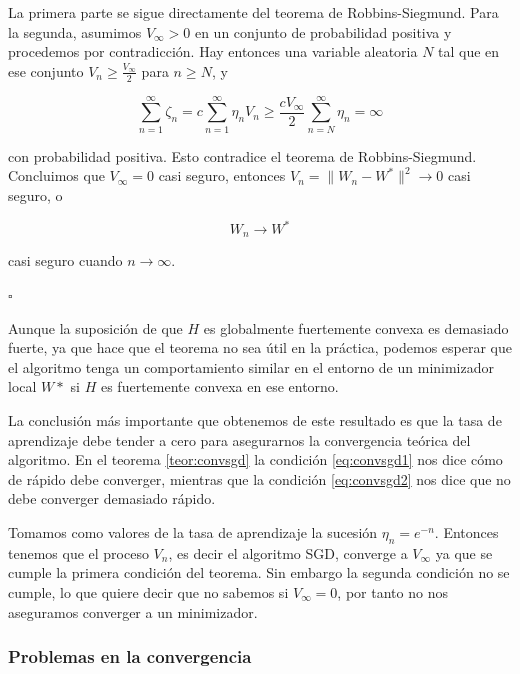 La primera parte se sigue directamente del teorema de Robbins-Siegmund. Para la segunda, asumimos $V_{\infty} > 0 $ en un conjunto de probabilidad positiva y procedemos por contradicción. Hay entonces una variable aleatoria $N$ tal que en ese conjunto $V_n \geq \frac{V_{\infty}}{2}$ para $n \geq N$, y 

\begin{equation*}
	\sum_{n=1}^{\infty} \zeta _n = c \sum_{n=1}^{\infty} \eta _n V_n \geq \frac{cV_{\infty}}{2} \sum_{n=N}^{\infty} \eta _n = \infty
\end{equation*}

con probabilidad positiva. Esto contradice el teorema de Robbins-Siegmund. Concluimos que $V_{\infty}=0$ casi seguro, entonces $V_n= \| W_n - W^* \| ^2 \rightarrow 0$ casi seguro, o 

\begin{equation*}
	W_n \rightarrow W^*
\end{equation*}

casi seguro cuando $n \rightarrow \infty$.
\begin{flushright}
    $\square$
\end{flushright} 

Aunque la suposición de que $H$ es globalmente fuertemente convexa es demasiado fuerte, ya que hace que el teorema no sea útil en la práctica, podemos esperar que el algoritmo tenga un comportamiento similar en el entorno de un minimizador local $W*$ si $H$ es fuertemente convexa en ese entorno.

La conclusión más importante que obtenemos de este resultado es que la tasa de aprendizaje debe tender a cero para asegurarnos la convergencia teórica del algoritmo. En el teorema \ref{teor:convsgd} la condición \ref{eq:convsgd1} nos dice cómo de rápido debe converger, mientras que la condición \ref{eq:convsgd2} nos dice que no debe converger demasiado rápido.

\begin{ejemplo}
	Tomamos como valores de la tasa de aprendizaje la sucesión $\eta _n = e^{-n}$. Entonces tenemos que el proceso $V_n$, es decir el algoritmo SGD, converge a $V_{\infty}$ ya que se cumple la primera condición del teorema. Sin embargo la segunda condición no se cumple, lo que quiere decir que no sabemos si $V_{\infty}=0$, por tanto no nos aseguramos converger a un minimizador. 
\end{ejemplo}

\subsubsection{Problemas en la convergencia}



